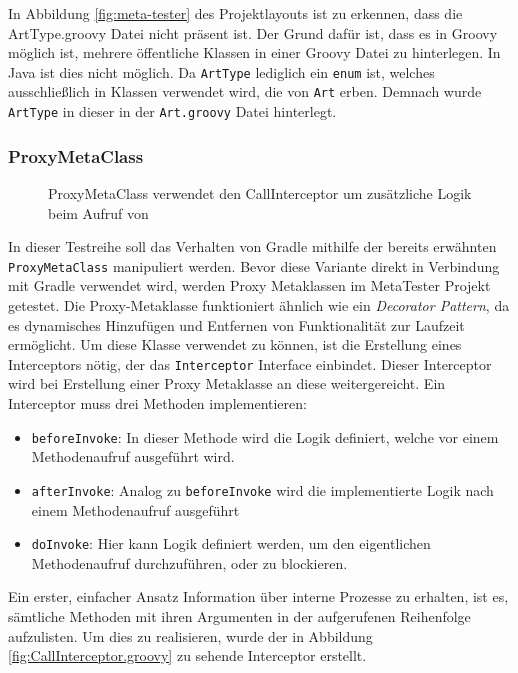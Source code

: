 In Abbildung \ref{fig:meta-tester} des Projektlayouts ist zu erkennen, dass die ArtType.groovy Datei nicht präsent ist. 
Der Grund dafür ist, dass es in Groovy möglich ist, mehrere öffentliche Klassen in einer Groovy Datei zu hinterlegen. 
In Java ist dies nicht möglich. 
Da \texttt{ArtType} lediglich ein \texttt{enum} ist, welches ausschließlich in Klassen verwendet wird, die von \texttt{Art} erben.
Demnach wurde \texttt{ArtType} in dieser in der \texttt{Art.groovy} Datei hinterlegt.


\subsubsection{ProxyMetaClass}


\begin{figure}[hbt!]
	\centering
	
	\caption{ProxyMetaClass verwendet den CallInterceptor um zusätzliche Logik beim Aufruf von }
	\label{fig:meta-proxy}
\end{figure}


In dieser Testreihe soll das Verhalten von Gradle mithilfe der bereits erwähnten \texttt{ProxyMetaClass} manipuliert werden.
Bevor diese Variante direkt in Verbindung mit Gradle verwendet wird, werden Proxy Metaklassen im MetaTester Projekt getestet. 
Die Proxy-Metaklasse funktioniert ähnlich wie ein \textit{Decorator Pattern}, da es dynamisches Hinzufügen und Entfernen von Funktionalität zur Laufzeit ermöglicht.
Um diese Klasse verwendet zu können, ist die Erstellung eines Interceptors nötig, der das \texttt{Interceptor} Interface einbindet. 
Dieser Interceptor wird bei Erstellung einer Proxy Metaklasse an diese weitergereicht. 
Ein Interceptor muss drei Methoden implementieren:

\begin{itemize}
	\item \texttt{beforeInvoke}:
	In dieser Methode wird die Logik definiert, welche vor einem Methodenaufruf ausgeführt wird.
	\item \texttt{afterInvoke}:
	Analog zu \texttt{beforeInvoke} wird die implementierte Logik nach einem Methodenaufruf ausgeführt
	\item \texttt{doInvoke}:
	Hier kann Logik definiert werden, um den eigentlichen Methodenaufruf durchzuführen, oder zu blockieren.
\end{itemize}

Ein erster, einfacher Ansatz Information über interne Prozesse zu erhalten, ist es, sämtliche Methoden mit ihren Argumenten in der aufgerufenen Reihenfolge aufzulisten. 
Um dies zu realisieren, wurde der in Abbildung \ref{fig:CallInterceptor.groovy} zu sehende Interceptor erstellt.

